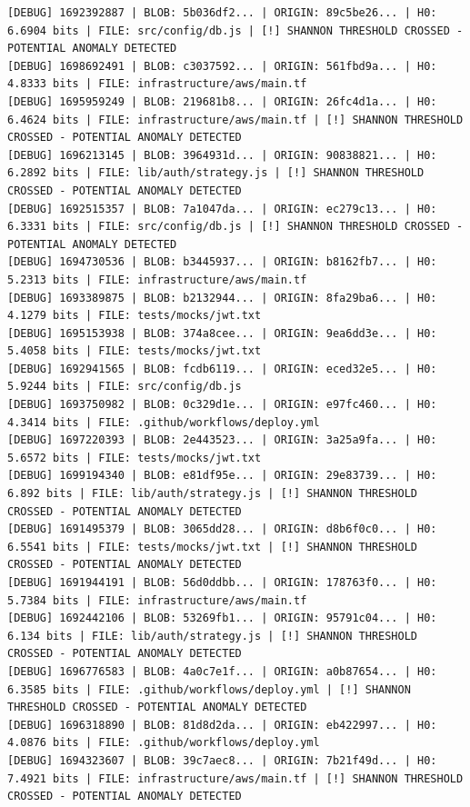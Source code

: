 \documentclass[12pt, a4paper, oneside]{report}
\begin{document}
\begin{lstlisting}[basicstyle=\tiny\ttfamily]
[DEBUG] 1692392887 | BLOB: 5b036df2... | ORIGIN: 89c5be26... | H0: 6.6904 bits | FILE: src/config/db.js | [!] SHANNON THRESHOLD CROSSED - POTENTIAL ANOMALY DETECTED
[DEBUG] 1698692491 | BLOB: c3037592... | ORIGIN: 561fbd9a... | H0: 4.8333 bits | FILE: infrastructure/aws/main.tf
[DEBUG] 1695959249 | BLOB: 219681b8... | ORIGIN: 26fc4d1a... | H0: 6.4624 bits | FILE: infrastructure/aws/main.tf | [!] SHANNON THRESHOLD CROSSED - POTENTIAL ANOMALY DETECTED
[DEBUG] 1696213145 | BLOB: 3964931d... | ORIGIN: 90838821... | H0: 6.2892 bits | FILE: lib/auth/strategy.js | [!] SHANNON THRESHOLD CROSSED - POTENTIAL ANOMALY DETECTED
[DEBUG] 1692515357 | BLOB: 7a1047da... | ORIGIN: ec279c13... | H0: 6.3331 bits | FILE: src/config/db.js | [!] SHANNON THRESHOLD CROSSED - POTENTIAL ANOMALY DETECTED
[DEBUG] 1694730536 | BLOB: b3445937... | ORIGIN: b8162fb7... | H0: 5.2313 bits | FILE: infrastructure/aws/main.tf
[DEBUG] 1693389875 | BLOB: b2132944... | ORIGIN: 8fa29ba6... | H0: 4.1279 bits | FILE: tests/mocks/jwt.txt
[DEBUG] 1695153938 | BLOB: 374a8cee... | ORIGIN: 9ea6dd3e... | H0: 5.4058 bits | FILE: tests/mocks/jwt.txt
[DEBUG] 1692941565 | BLOB: fcdb6119... | ORIGIN: eced32e5... | H0: 5.9244 bits | FILE: src/config/db.js
[DEBUG] 1693750982 | BLOB: 0c329d1e... | ORIGIN: e97fc460... | H0: 4.3414 bits | FILE: .github/workflows/deploy.yml
[DEBUG] 1697220393 | BLOB: 2e443523... | ORIGIN: 3a25a9fa... | H0: 5.6572 bits | FILE: tests/mocks/jwt.txt
[DEBUG] 1699194340 | BLOB: e81df95e... | ORIGIN: 29e83739... | H0: 6.892 bits | FILE: lib/auth/strategy.js | [!] SHANNON THRESHOLD CROSSED - POTENTIAL ANOMALY DETECTED
[DEBUG] 1691495379 | BLOB: 3065dd28... | ORIGIN: d8b6f0c0... | H0: 6.5541 bits | FILE: tests/mocks/jwt.txt | [!] SHANNON THRESHOLD CROSSED - POTENTIAL ANOMALY DETECTED
[DEBUG] 1691944191 | BLOB: 56d0ddbb... | ORIGIN: 178763f0... | H0: 5.7384 bits | FILE: infrastructure/aws/main.tf
[DEBUG] 1692442106 | BLOB: 53269fb1... | ORIGIN: 95791c04... | H0: 6.134 bits | FILE: lib/auth/strategy.js | [!] SHANNON THRESHOLD CROSSED - POTENTIAL ANOMALY DETECTED
[DEBUG] 1696776583 | BLOB: 4a0c7e1f... | ORIGIN: a0b87654... | H0: 6.3585 bits | FILE: .github/workflows/deploy.yml | [!] SHANNON THRESHOLD CROSSED - POTENTIAL ANOMALY DETECTED
[DEBUG] 1696318890 | BLOB: 81d8d2da... | ORIGIN: eb422997... | H0: 4.0876 bits | FILE: .github/workflows/deploy.yml
[DEBUG] 1694323607 | BLOB: 39c7aec8... | ORIGIN: 7b21f49d... | H0: 7.4921 bits | FILE: infrastructure/aws/main.tf | [!] SHANNON THRESHOLD CROSSED - POTENTIAL ANOMALY DETECTED

\end{lstlisting}
\end{document}
